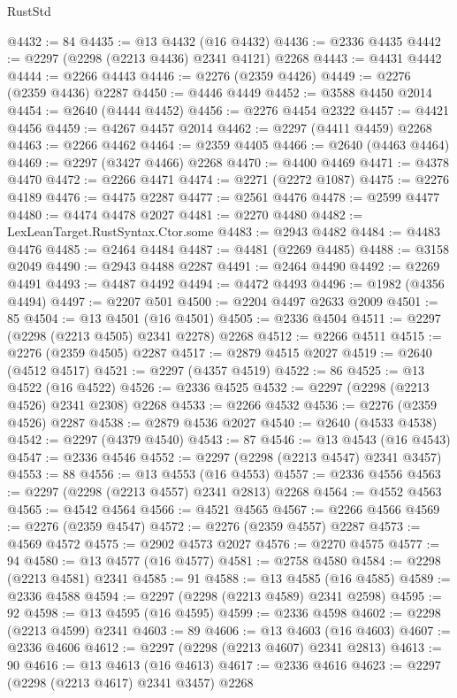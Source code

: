\begin{lexlean}{RustStd}
\begin{coremodule}
@4432 := 84
@4435 := @13 @4432 (@16 @4432)
@4436 := @2336 @4435
@4442 := @2297 (@2298 (@2213 @4436) @2341 @4121) @2268
@4443 := @4431 @4442
@4444 := @2266 @4443
@4446 := @2276 (@2359 @4426)
@4449 := @2276 (@2359 @4436) @2287
@4450 := @4446 @4449
@4452 := @3588 @4450 @2014
@4454 := @2640 (@4444 @4452)
@4456 := @2276 @4454 @2322
@4457 := @4421 @4456
@4459 := @4267 @4457 @2014
@4462 := @2297 (@4411 @4459) @2268
@4463 := @2266 @4462
@4464 := @2359 @4405
@4466 := @2640 (@4463 @4464)
@4469 := @2297 (@3427 @4466) @2268
@4470 := @4400 @4469
@4471 := @4378 @4470
@4472 := @2266 @4471
@4474 := @2271 (@2272 @1087)
@4475 := @2276 @4189
@4476 := @4475 @2287
@4477 := @2561 @4476
@4478 := @2599 @4477
@4480 := @4474 @4478 @2027
@4481 := @2270 @4480
@4482 := LexLeanTarget.RustSyntax.Ctor.some
@4483 := @2943 @4482
@4484 := @4483 @4476
@4485 := @2464 @4484
@4487 := @4481 (@2269 @4485)
@4488 := @3158 @2049
@4490 := @2943 @4488 @2287
@4491 := @2464 @4490
@4492 := @2269 @4491
@4493 := @4487 @4492
@4494 := @4472 @4493
@4496 := @1982 (@4356 @4494)
@4497 := @2207 @501
@4500 := @2204 @4497 @2633 @2009
@4501 := 85
@4504 := @13 @4501 (@16 @4501)
@4505 := @2336 @4504
@4511 := @2297 (@2298 (@2213 @4505) @2341 @2278) @2268
@4512 := @2266 @4511
@4515 := @2276 (@2359 @4505) @2287
@4517 := @2879 @4515 @2027
@4519 := @2640 (@4512 @4517)
@4521 := @2297 (@4357 @4519)
@4522 := 86
@4525 := @13 @4522 (@16 @4522)
@4526 := @2336 @4525
@4532 := @2297 (@2298 (@2213 @4526) @2341 @2308) @2268
@4533 := @2266 @4532
@4536 := @2276 (@2359 @4526) @2287
@4538 := @2879 @4536 @2027
@4540 := @2640 (@4533 @4538)
@4542 := @2297 (@4379 @4540)
@4543 := 87
@4546 := @13 @4543 (@16 @4543)
@4547 := @2336 @4546
@4552 := @2297 (@2298 (@2213 @4547) @2341 @3457)
@4553 := 88
@4556 := @13 @4553 (@16 @4553)
@4557 := @2336 @4556
@4563 := @2297 (@2298 (@2213 @4557) @2341 @2813) @2268
@4564 := @4552 @4563
@4565 := @4542 @4564
@4566 := @4521 @4565
@4567 := @2266 @4566
@4569 := @2276 (@2359 @4547)
@4572 := @2276 (@2359 @4557) @2287
@4573 := @4569 @4572
@4575 := @2902 @4573 @2027
@4576 := @2270 @4575
@4577 := 94
@4580 := @13 @4577 (@16 @4577)
@4581 := @2758 @4580
@4584 := @2298 (@2213 @4581) @2341
@4585 := 91
@4588 := @13 @4585 (@16 @4585)
@4589 := @2336 @4588
@4594 := @2297 (@2298 (@2213 @4589) @2341 @2598)
@4595 := 92
@4598 := @13 @4595 (@16 @4595)
@4599 := @2336 @4598
@4602 := @2298 (@2213 @4599) @2341
@4603 := 89
@4606 := @13 @4603 (@16 @4603)
@4607 := @2336 @4606
@4612 := @2297 (@2298 (@2213 @4607) @2341 @2813)
@4613 := 90
@4616 := @13 @4613 (@16 @4613)
@4617 := @2336 @4616
@4623 := @2297 (@2298 (@2213 @4617) @2341 @3457) @2268

\end{coremodule}
\end{lexlean}
